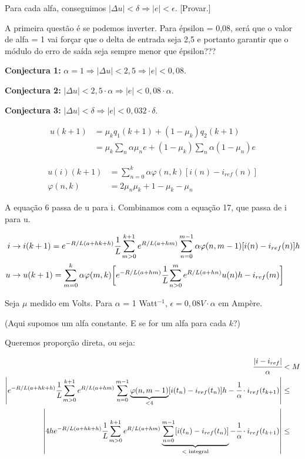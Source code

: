\documentclass[11pt]{article}
\begin{document}
Para cada alfa, conseguimos $| \Delta u | < \delta \Rightarrow | e | < \epsilon$. [Provar.]

A primeira quest\~ao \'e se podemos inverter. Para \'epsilon = 0,08, ser\'a que o valor de alfa = 1 vai for\c{c}ar que o delta de entrada seja 2,5 e portanto garantir que o m\'odulo do erro de sa\'ida seja sempre menor que \'epsilon???

\textbf{Conjectura 1: }$\alpha = 1 \Rightarrow |\Delta u| < 2,5 \Rightarrow |e| < 0,08$.

\textbf{Conjectura 2: }$ |\Delta u| < 2,5\cdot \alpha \Rightarrow |e| < 0,08\cdot \alpha $.

\textbf{Conjectura 3: }$ |\Delta u| < \delta \Rightarrow |e| < 0,032\cdot \delta$.

\begin{align}
u(k+1) &= \mu_k q_1(k+1) + (1 - \mu_k) q_2(k+1) \\
&= \mu_k \sum_n \alpha \mu_n e + (1 - \mu_k) \sum_n \alpha (1 - \mu_n) e
\end{align}

\begin{align}
u(i)(k+1) &= \sum_{n = 0}^k \alpha \varphi(n,k) [i(n) - i_{ref}(n)] \\
\varphi(n, k) &= 2 \mu_n \mu_k + 1 - \mu_k - \mu_n
\end{align}

A equa\c{c}\~ao 6 passa de u para i. Combinamos com a equa\c{c}\~ao 17, que passa de i para u.

\begin{align}
i &\to i(k+ 1) = e^{-R/L (a + hk + h)}\cfrac{1}{L}\sum_{m > 0}^{k + 1} e^{R/L (a + hm)}  \sum_{n = 0}^{m - 1} \alpha \varphi(n,m-1) [i(n) - i_{ref}(n)] h \\
u &\to u(k + 1) = \sum_{m = 0}^k \alpha \varphi(m,k) \bigg[e^{-R/L (a + hm)}\cfrac{1}{L}\sum_{n > 0}^m e^{R/L (a + hn)} u(n) h - i_{ref}(m)\bigg]
\end{align}

Seja $\mu$ medido em Volts. Para $\alpha$ = 1 Watt$^{-1}$, $\epsilon = 0,08V \cdot \alpha$ em Amp\`ere.

(Aqui supomos um alfa constante. E se for um alfa para cada $k$?)

Queremos propor\c{c}\~ao direta, ou seja:

\begin{align}
  \cfrac{|i - i_{ref}|}{\alpha} &< M \\
  \left\vert e^{-R/L (a + hk + h)}\cfrac{1}{L}\sum_{m > 0}^{k + 1} e^{R/L (a + hm)}  \sum_{n = 0}^{m - 1} \underbrace{\varphi(n,m-1)}_{<4} [i(t_n) - i_{ref}(t_n)] h - \cfrac{1}{\alpha} \cdot i_{ref}(t_{k+1}) \right\vert &\le  \\
  \left\vert 4h e^{-R/L (a + hk + h)}\cfrac{1}{L}\sum_{m > 0}^{k + 1} e^{R/L (a + hm)}  \underbrace{\sum_{n = 0}^{m - 1} [i(t_n) - i_{ref}(t_n)]}_{<\text{ integral}} - \cfrac{1}{\alpha} \cdot i_{ref}(t_{k+1}) \right\vert &\le
\end{align}
\end{document}

